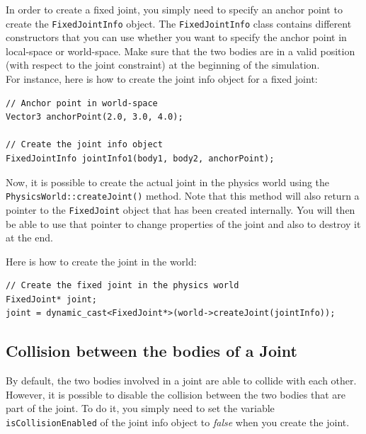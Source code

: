 \documentclass[a4paper,12pt]{article}
\begin{document}
    In order to create a fixed joint, you simply need to specify an anchor point to create the \texttt{FixedJointInfo}
    object. The \texttt{FixedJointInfo} class contains different constructors that you can use whether you want to specify the anchor point in local-space
    or world-space. Make sure that the two bodies are in a valid position (with respect to the joint constraint) at the beginning of the simulation.\\

    For instance, here is how to create the joint info object for a fixed joint: \\

    \begin{lstlisting}
// Anchor point in world-space
Vector3 anchorPoint(2.0, 3.0, 4.0);

// Create the joint info object
FixedJointInfo jointInfo1(body1, body2, anchorPoint);
  \end{lstlisting}

    \vspace{0.6cm}

    \begin{sloppypar}
    Now, it is possible to create the actual joint in the physics world using the \texttt{PhysicsWorld::createJoint()} method.
    Note that this method will also return a pointer to the \texttt{FixedJoint} object that has been created internally. You will then
    be able to use that pointer to change properties of the joint and also to destroy it at the end. \\
    \end{sloppypar}

    Here is how to create the joint in the world: \\

    \begin{lstlisting}
// Create the fixed joint in the physics world
FixedJoint* joint;
joint = dynamic_cast<FixedJoint*>(world->createJoint(jointInfo));
  \end{lstlisting}

    \subsection{Collision between the bodies of a Joint}

    By default, the two bodies involved in a joint are able to collide with each other. However, it is possible to disable the collision between the two bodies that are part
    of the joint. To do it, you simply need to set the variable \texttt{isCollisionEnabled} of the joint info object to \emph{false} when you create the joint. \\
\end{document}
